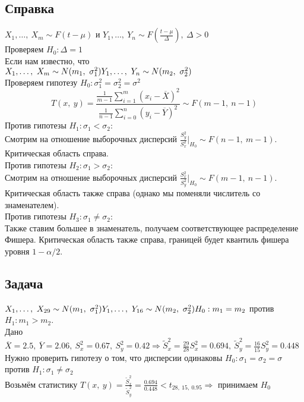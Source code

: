 \documentclass[12pt, a4paper]{article}
\begin{document}
\subsection*{Справка}
$X_1,\dots,\ X_m \sim F(t - \mu)$ и $Y_1,\dots,\ Y_n \sim F\left( \frac{t - \mu}{\Delta} \right),\ \Delta > 0$\\
Проверяем $H_0: \Delta = 1$\\
Если нам известно, что\\
$X_1,\dots,\ X_m \sim N(m_1,\ \sigma_1^2)\\
Y_1,\dots,\ Y_n \sim N(m_2,\ \sigma_2^2)$\\
Проверяем гипотезу $H_0: \sigma_1^2 = \sigma_2^2 = \sigma^2$
\[T(x,\ y) = \frac{\frac{1}{m - 1} \sum_{i = 1}^{m}(x_i - \overline{X})^2}{ \frac{1}{n - 1} \sum_{i = 0}^{n} (y_i - \overline{Y})^2 } \sim F(m - 1,\ n - 1)\]
Против гипотезы $H_1: \sigma_1 < \sigma_2$:\\
Смотрим на отношение выборочных дисперсий $\frac{S_y^2}{S_x^2}\Big|_{H_0} \sim F(n - 1,\ m - 1)$. Критическая область справа.\\
Против гипотезы $H_2: \sigma_1 > \sigma_2$:\\
Смотрим на отношение выборочных дисперсий $\frac{S_x^2}{S_y^2}\Big|_{H_0} \sim F(m - 1,\ n - 1)$. Критическая область также справа (однако мы поменяли числитель со знаменателем).\\
Против гипотезы $H_3: \sigma_1 \neq \sigma_2$:\\
Также ставим большее в знаменатель, получаем соответствующее распределение Фишера. Критическая область также справа, границей будет квантиль фишера уровня $1 - \alpha/2$.
\subsection*{Задача}
$X_1,\dots,\ X_{29} \sim N(m_1,\ \sigma^2_1)\\
Y_1,\dots,\ Y_{16} \sim N(m_2,\ \sigma^2_2)\\
H_0: m_1 = m_2$ против $H_1: m_1 > m_2$.\\
Дано $\overline{X} = 2.5,\ \overline{Y} = 2.06,\ S_{x}^2 = 0.67,\ S_{y}^2 = 0.42 \Rightarrow \tilde S_x^2 = \frac{29}{28} S_x^2 = 0.694,\ \tilde S_y^2 = \frac{16}{15} S_y^2 = 0.448$\\
Нужно проверить гипотезу о том, что дисперсии одинаковы $H_0: \sigma_1 = \sigma_2 = \sigma$ против $H_1: \sigma_1 \neq \sigma_2$\\
Возьмём статистику $T(x,\ y) = \frac{\tilde S_x^2}{\tilde S_y^2} = \frac{0.694}{0.448} < t_{28,\ 15,\ 0.95} \Rightarrow$ принимаем $H_0$
\end{document}

